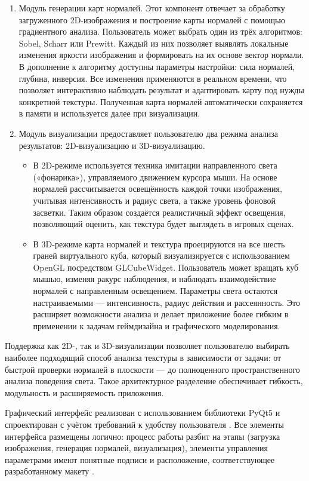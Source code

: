 \begin{enumerate}
	\item Модуль генерации карт нормалей. Этот компонент отвечает за обработку загруженного 2D-изображения и построение карты нормалей с помощью градиентного анализа. Пользователь может выбрать один из трёх алгоритмов: Sobel, Scharr или Prewitt. Каждый из них позволяет выявлять локальные изменения яркости изображения и формировать на их основе вектор нормали. В дополнение к алгоритму доступны параметры настройки: сила нормалей, глубина, инверсия. Все изменения применяются в реальном времени, что позволяет интерактивно наблюдать результат и адаптировать карту под нужды конкретной текстуры. Полученная карта нормалей автоматически сохраняется в памяти и используется далее при визуализации.
	\item Модуль визуализации предоставляет пользователю два режима анализа результатов: 2D-визуализацию и 3D-визуализацию.
	\begin{itemize}
		\item В 2D-режиме используется техника имитации направленного света («фонарика»), управляемого движением курсора мыши. На основе нормалей рассчитывается освещённость каждой точки изображения, учитывая интенсивность и радиус света, а также уровень фоновой засветки. Таким образом создаётся реалистичный эффект освещения, позволяющий оценить, как текстура будет выглядеть в игровых сценах.
		\item В 3D-режиме карта нормалей и текстура проецируются на все шесть граней виртуального куба, который визуализируется с использованием OpenGL посредством GLCubeWidget. Пользователь может вращать куб мышью, изменяя ракурс наблюдения, и наблюдать взаимодействие нормалей с направленным освещением. Параметры света остаются настраиваемыми — интенсивность, радиус действия и рассеянность. Это расширяет возможности анализа и делает приложение более гибким в применении к задачам геймдизайна и графического моделирования.
	\end{itemize}
\end{enumerate}

Поддержка как 2D-, так и 3D-визуализации позволяет пользователю выбирать наиболее подходящий способ анализа текстуры в зависимости от задачи: от быстрой проверки нормалей в плоскости — до полноценного пространственного анализа поведения света. Такое архитектурное разделение обеспечивает гибкость, модульность и расширяемость приложения.

Графический интерфейс реализован с использованием библиотеки PyQt5 и спроектирован с учётом требований к удобству пользователя \cite{prokhorenok2021}. Все элементы интерфейса размещены логично: процесс работы разбит на этапы (загрузка изображения, генерация нормалей, визуализация), элементы управления параметрами имеют понятные подписи и расположение, соответствующее разработанному макету \cite{cooper2020}.

